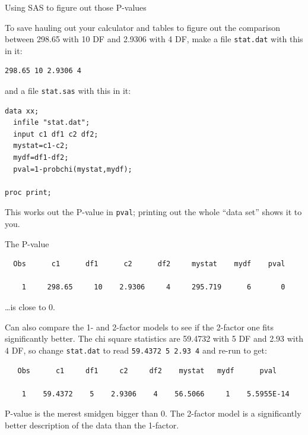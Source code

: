 \documentclass[pdf]{prosper}
\begin{document}
  \begin{slide}{Using SAS to figure out those P-values}

To save hauling out your calculator and tables to figure out the comparison between 298.65 with 10 DF and 2.9306 with 4 DF, make a file \verb-stat.dat- with this in it:

{\scriptsize
\begin{verbatim}
298.65 10 2.9306 4
\end{verbatim}
}

and a file \verb-stat.sas- with this in it:

{\scriptsize
\begin{verbatim}
data xx;
  infile "stat.dat";
  input c1 df1 c2 df2;
  mystat=c1-c2;
  mydf=df1-df2;
  pval=1-probchi(mystat,mydf);

proc print;

\end{verbatim}
}

This works out the P-value in \verb-pval-; printing out the whole ``data set'' shows it to you.

    
  \end{slide}

  \begin{slide}{The P-value}

{\scriptsize
\begin{verbatim}
  Obs      c1      df1      c2      df2     mystat    mydf    pval

    1     298.65     10    2.9306     4     295.719      6       0 
\end{verbatim}
}

\ldots is close to 0.

\vspace{3ex}

Can also compare the 1- and 2-factor models to see if the 2-factor one fits significantly better. The chi square statistics are 59.4732 with 5 DF and 2.93 with 4 DF, so change \verb-stat.dat- to read \verb-59.4372 5 2.93 4- and re-run to get:

{\scriptsize
\begin{verbatim}
   Obs      c1     df1     c2     df2    mystat   mydf      pval

    1    59.4372    5    2.9306    4    56.5066     1    5.5955E-14
\end{verbatim}
}

P-value is the merest smidgen bigger than 0. The 2-factor model is a significantly better description of the data than the 1-factor.
    
  \end{slide}
\end{document}
